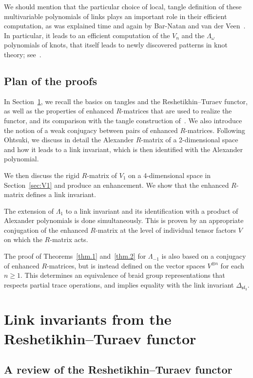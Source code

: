\documentclass[10pt,a4paper]{amsart}
\numberwithin{equation}{section}
\theoremstyle{definition}
\begin{document}
We should mention that the particular choice of local, tangle definition of these multivariable polynomials
of links plays an important role in their efficient computation, as was explained
time and again by Bar-Natan and van der Veen~\cite{BNV:PG,BNV:API}.
In particular, it leads to an efficient computation of the $V_n$ and the
$\Lambda_\omega$ polynomials of knots, that itself leads to newly discovered
patterns in knot theory; see~\cite{GL:patterns}.

\subsection{Plan of the proofs}

In Section~\ref{sec:RT}, we recall the basics on tangles and the Reshetikhin--Turaev
functor, as well as the properties of enhanced $R$-matrices that are
used to realize the functor, and its comparison with the tangle construction of~\cite{GK:multi}. We also introduce the notion of a weak conjugacy between pairs of enhanced $R$-matrices. Following Ohtsuki, we discuss in detail the
Alexander $R$-matrix of a 2-dimensional space and how it leads to a link invariant,
which is then identified with the Alexander polynomial.

We then discuss the rigid $R$-matrix of $V_1$ on a 4-dimensional space in Section~\ref{sec:V1} and produce an enhancement. We show that the enhanced $R$-matrix
defines a link invariant.

The extension of $\Lambda_1$ to a link invariant and its identification with a product
of Alexander polynomials is done simultaneously. This is proven by an appropriate
conjugation of the enhanced $R$-matrix at the level of individual tensor factors $V$
on which the $R$-matrix acts.

The proof of Theorems~\ref{thm.1} and~\ref{thm.2} for $\Lambda_{-1}$ is also based on a conjugacy of enhanced $R$-matrices, but is instead defined on the vector spaces $V^{\otimes n}$ for each $n\geq 1$. This determines an equivalence of braid group representations that respects partial trace operations, and implies equality with the link invariant $\Delta_{\mathfrak{sl}_3}$.



\section{Link invariants from the Reshetikhin--Turaev functor}
\label{sec:RT}

\subsection{A review of the Reshetikhin--Turaev functor}
\label{sub:RT}
\end{document}
